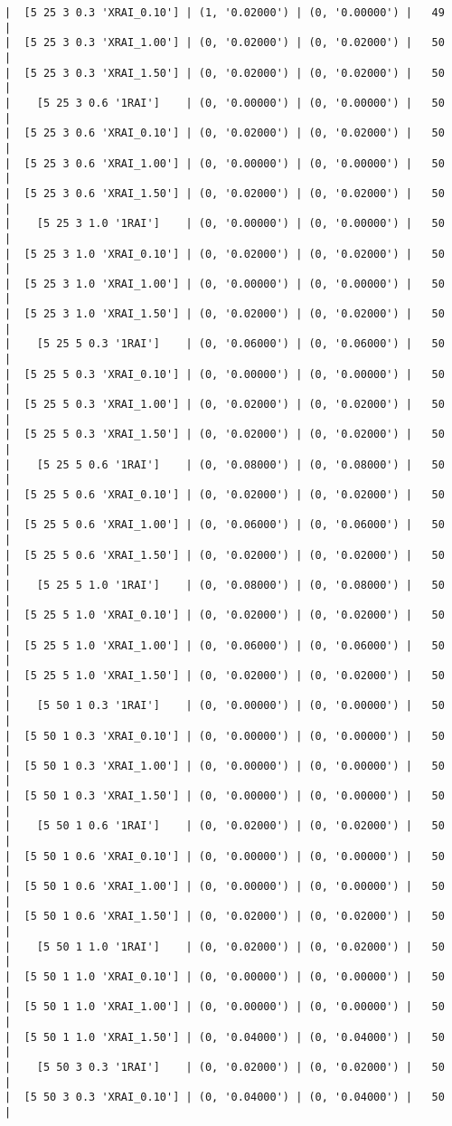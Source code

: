 \documentclass{article}
\begin{document}
\begin{verbatim}
|  [5 25 3 0.3 'XRAI_0.10'] | (1, '0.02000') | (0, '0.00000') |   49  |
|  [5 25 3 0.3 'XRAI_1.00'] | (0, '0.02000') | (0, '0.02000') |   50  |
|  [5 25 3 0.3 'XRAI_1.50'] | (0, '0.02000') | (0, '0.02000') |   50  |
|    [5 25 3 0.6 '1RAI']    | (0, '0.00000') | (0, '0.00000') |   50  |
|  [5 25 3 0.6 'XRAI_0.10'] | (0, '0.02000') | (0, '0.02000') |   50  |
|  [5 25 3 0.6 'XRAI_1.00'] | (0, '0.00000') | (0, '0.00000') |   50  |
|  [5 25 3 0.6 'XRAI_1.50'] | (0, '0.02000') | (0, '0.02000') |   50  |
|    [5 25 3 1.0 '1RAI']    | (0, '0.00000') | (0, '0.00000') |   50  |
|  [5 25 3 1.0 'XRAI_0.10'] | (0, '0.02000') | (0, '0.02000') |   50  |
|  [5 25 3 1.0 'XRAI_1.00'] | (0, '0.00000') | (0, '0.00000') |   50  |
|  [5 25 3 1.0 'XRAI_1.50'] | (0, '0.02000') | (0, '0.02000') |   50  |
|    [5 25 5 0.3 '1RAI']    | (0, '0.06000') | (0, '0.06000') |   50  |
|  [5 25 5 0.3 'XRAI_0.10'] | (0, '0.00000') | (0, '0.00000') |   50  |
|  [5 25 5 0.3 'XRAI_1.00'] | (0, '0.02000') | (0, '0.02000') |   50  |
|  [5 25 5 0.3 'XRAI_1.50'] | (0, '0.02000') | (0, '0.02000') |   50  |
|    [5 25 5 0.6 '1RAI']    | (0, '0.08000') | (0, '0.08000') |   50  |
|  [5 25 5 0.6 'XRAI_0.10'] | (0, '0.02000') | (0, '0.02000') |   50  |
|  [5 25 5 0.6 'XRAI_1.00'] | (0, '0.06000') | (0, '0.06000') |   50  |
|  [5 25 5 0.6 'XRAI_1.50'] | (0, '0.02000') | (0, '0.02000') |   50  |
|    [5 25 5 1.0 '1RAI']    | (0, '0.08000') | (0, '0.08000') |   50  |
|  [5 25 5 1.0 'XRAI_0.10'] | (0, '0.02000') | (0, '0.02000') |   50  |
|  [5 25 5 1.0 'XRAI_1.00'] | (0, '0.06000') | (0, '0.06000') |   50  |
|  [5 25 5 1.0 'XRAI_1.50'] | (0, '0.02000') | (0, '0.02000') |   50  |
|    [5 50 1 0.3 '1RAI']    | (0, '0.00000') | (0, '0.00000') |   50  |
|  [5 50 1 0.3 'XRAI_0.10'] | (0, '0.00000') | (0, '0.00000') |   50  |
|  [5 50 1 0.3 'XRAI_1.00'] | (0, '0.00000') | (0, '0.00000') |   50  |
|  [5 50 1 0.3 'XRAI_1.50'] | (0, '0.00000') | (0, '0.00000') |   50  |
|    [5 50 1 0.6 '1RAI']    | (0, '0.02000') | (0, '0.02000') |   50  |
|  [5 50 1 0.6 'XRAI_0.10'] | (0, '0.00000') | (0, '0.00000') |   50  |
|  [5 50 1 0.6 'XRAI_1.00'] | (0, '0.00000') | (0, '0.00000') |   50  |
|  [5 50 1 0.6 'XRAI_1.50'] | (0, '0.02000') | (0, '0.02000') |   50  |
|    [5 50 1 1.0 '1RAI']    | (0, '0.02000') | (0, '0.02000') |   50  |
|  [5 50 1 1.0 'XRAI_0.10'] | (0, '0.00000') | (0, '0.00000') |   50  |
|  [5 50 1 1.0 'XRAI_1.00'] | (0, '0.00000') | (0, '0.00000') |   50  |
|  [5 50 1 1.0 'XRAI_1.50'] | (0, '0.04000') | (0, '0.04000') |   50  |
|    [5 50 3 0.3 '1RAI']    | (0, '0.02000') | (0, '0.02000') |   50  |
|  [5 50 3 0.3 'XRAI_0.10'] | (0, '0.04000') | (0, '0.04000') |   50  |

\end{verbatim}
\end{document}
